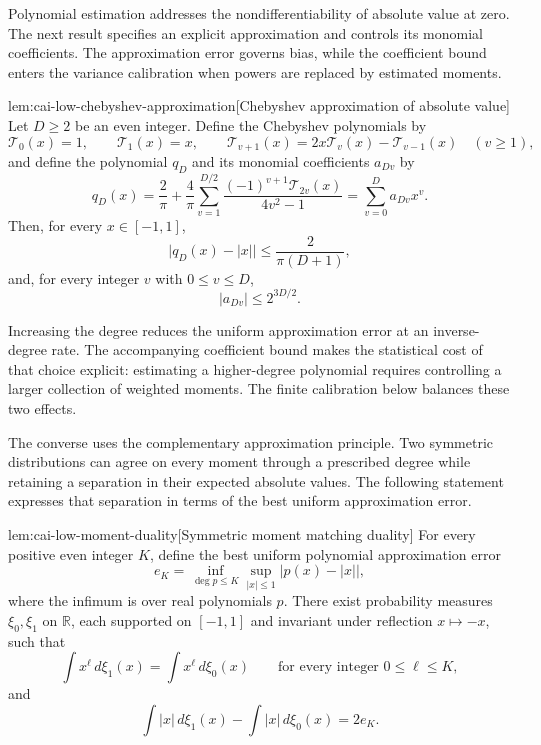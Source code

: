 Polynomial estimation addresses the nondifferentiability of absolute value at zero. The next result specifies an explicit approximation and controls its monomial coefficients. The approximation error governs bias, while the coefficient bound enters the variance calibration when powers are replaced by estimated moments.

\begin{theoremv}{lem:cai-low-chebyshev-approximation}[Chebyshev approximation of absolute value]
Let \(D\ge 2\) be an even integer. Define the Chebyshev polynomials by
\[
\mathcal T_0(x)=1,\qquad \mathcal T_1(x)=x,\qquad
\mathcal T_{v+1}(x)=2x\mathcal T_v(x)-\mathcal T_{v-1}(x)
\quad (v\ge 1),
\]
and define the polynomial \(q_D\) and its monomial coefficients \(a_{Dv}\) by
\[
q_D(x)=\frac{2}{\pi}
+\frac{4}{\pi}\sum_{v=1}^{D/2}
\frac{(-1)^{v+1}\mathcal T_{2v}(x)}{4v^2-1}
=\sum_{v=0}^{D}a_{Dv}x^v.
\]
Then, for every \(x\in[-1,1]\),
\[
\bigl|q_D(x)-|x|\bigr|\le \frac{2}{\pi(D+1)},
\]
and, for every integer \(v\) with \(0\le v\le D\),
\[
|a_{Dv}|\le 2^{3D/2}.
\]
\end{theoremv}

Increasing the degree reduces the uniform approximation error at an inverse-degree rate. The accompanying coefficient bound makes the statistical cost of that choice explicit: estimating a higher-degree polynomial requires controlling a larger collection of weighted moments. The finite calibration below balances these two effects.

The converse uses the complementary approximation principle. Two symmetric distributions can agree on every moment through a prescribed degree while retaining a separation in their expected absolute values. The following statement expresses that separation in terms of the best uniform approximation error.

\begin{theoremv}{lem:cai-low-moment-duality}[Symmetric moment matching duality]
For every positive even integer \(K\), define the best uniform polynomial approximation error
\[
e_K=\inf_{\deg p\le K}\sup_{|x|\le 1}\bigl|p(x)-|x|\bigr|,
\]
where the infimum is over real polynomials \(p\). There exist probability measures \(\xi_0,\xi_1\) on \(\mathbb R\), each supported on \([-1,1]\) and invariant under reflection \(x\mapsto -x\), such that
\[
\int x^\ell\,d\xi_1(x)=\int x^\ell\,d\xi_0(x)
\qquad\text{for every integer }0\le \ell\le K,
\]
and
\[
\int |x|\,d\xi_1(x)-\int |x|\,d\xi_0(x)=2e_K.
\]
\end{theoremv}

